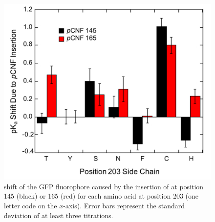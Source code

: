 \begin{figure}
    \center
    \includegraphics[width=\single]{figures-gfp-pKa/pKa_by_side_chain.png}
    \caption[\pKa{} shifts due to the insertion of \pCNF{}]{
        \pKa{} shift of the GFP fluorophore caused by the insertion of \pCNF{} at position 145 (black) or 165 (red) for each amino acid at position 203 (one letter code on the $x$-axis). 
        Error bars represent the standard deviation of at least three titrations.
    }
    \label{fig:pKa_sidechain}
\end{figure}

